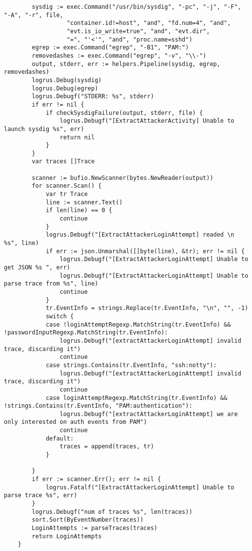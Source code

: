 \begin{verbatim}
        sysdig := exec.Command("/usr/bin/sysdig", "-pc", "-j", "-F", "-A", "-r", file, 
                  "container.id!=host", "and", "fd.num=4", "and", 
                  "evt.is_io_write=true", "and", "evt.dir", 
                  "=", "'<'", "and", "proc.name=sshd")
        egrep := exec.Command("egrep", "-B1", "PAM:")
        removedashes := exec.Command("egrep", "-v", "\\-")
        output, stderr, err := helpers.Pipeline(sysdig, egrep, removedashes)
        logrus.Debug(sysdig)
        logrus.Debug(egrep)
        logrus.Debugf("STDERR: %s", stderr)
        if err != nil {
            if checkSysdigFailure(output, stderr, file) {
                logrus.Debugf("[ExtractAttackerActivity] Unable to launch sysdig %s", err)
                return nil
            }
        }
        var traces []Trace
    
        scanner := bufio.NewScanner(bytes.NewReader(output))
        for scanner.Scan() {
            var tr Trace
            line := scanner.Text()
            if len(line) == 0 {
                continue
            }
            logrus.Debugf("[ExtractAttackerLoginAttempt] readed \n %s", line)
            if err := json.Unmarshal([]byte(line), &tr); err != nil {
                logrus.Debugf("[ExtractAttackerLoginAttempt] Unable to get JSON %s ", err)
                logrus.Debugf("[ExtractAttackerLoginAttempt] Unable to parse trace from %s", line)
                continue
            }
            tr.EventInfo = strings.Replace(tr.EventInfo, "\n", "", -1)
            switch {
            case !loginAttemptRegexp.MatchString(tr.EventInfo) && !passwordInputRegexp.MatchString(tr.EventInfo):
                logrus.Debugf("[extractAttackerLoginAttempt] invalid trace, discarding it")
                continue
            case strings.Contains(tr.EventInfo, "ssh:notty"):
                logrus.Debugf("[extractAttackerLoginAttempt] invalid trace, discarding it")
                continue
            case loginAttemptRegexp.MatchString(tr.EventInfo) && !strings.Contains(tr.EventInfo, "PAM:authentication"):
                logrus.Debugf("[extractAttackerLoginAttempt] we are only interested on auth events from PAM")
                continue
            default:
                traces = append(traces, tr)
            }
    
        }
        if err := scanner.Err(); err != nil {
            logrus.Fatalf("[ExtractAttackerLoginAttempt] Unable to parse trace %s", err)
        }
        logrus.Debugf("num of traces %s", len(traces))
        sort.Sort(ByEventNumber(traces))
        LoginAttempts := parseTraces(traces)
        return LoginAttempts
    }
    

\end{verbatim}
